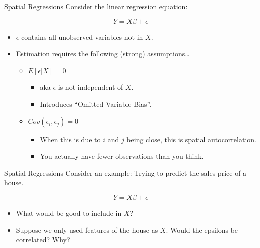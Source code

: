 \documentclass[
  8pt,
  ignorenonframetext,
]{beamer}
\providecommand{\tightlist}{%
  \setlength{\itemsep}{0pt}\setlength{\parskip}{0pt}}
\begin{document}
\begin{frame}{Spatial Regressions}
\protect\hypertarget{spatial-regressions}{}
Consider the linear regression equation:

\[Y = X\beta + \epsilon\] \pause

\begin{itemize}
\tightlist
\item
  \(\epsilon\) contains all unobserved variables not in \(X\).
\item
  Estimation requires the following (strong) assumptions\ldots{}

  \begin{itemize}
  \tightlist
  \item
    \(E[\epsilon | X] = 0\)

    \begin{itemize}
    \tightlist
    \item
      aka \(\epsilon\) is not independent of \(X\).
    \item
      Introduces ``Omitted Variable Bias''. \pause
    \end{itemize}
  \item
    \(Cov(\epsilon_i, \epsilon_j) = 0\)

    \begin{itemize}
    \tightlist
    \item
      When this is due to \(i\) and \(j\) being close, this is spatial
      autocorrelation.
    \item
      You actually have fewer observations than you think.
    \end{itemize}
  \end{itemize}
\end{itemize}
\end{frame}

\begin{frame}{Spatial Regressions}
\protect\hypertarget{spatial-regressions-1}{}
Consider an example: Trying to predict the sales price of a house.

\[Y = X\beta + \epsilon\]

\begin{itemize}
\tightlist
\item
  What would be good to include in \(X\)? \pause
\item
  Suppose we only used features of the house as \(X\). Would the
  epsilons be correlated? Why?
\end{itemize}
\end{frame}
\end{document}
